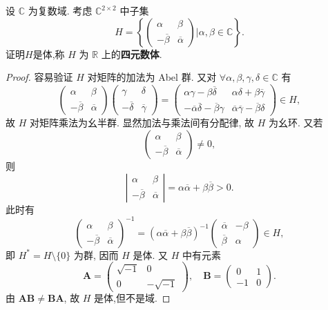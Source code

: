 \documentclass[../../main.tex]{subfiles}%
\begin{document}
\begin{theorem}\label{theorem:抽象代数--例题1.4.8}
设 \( \mathbb{C} \) 为复数域. 考虑 \( \mathbb{C}^{2 \times 2} \) 中子集
\[
H = \left\{ \begin{pmatrix} \alpha & \beta \\ -\overline{\beta} & \overline{\alpha} \end{pmatrix} \bigg| \alpha,\beta \in \mathbb{C} \right\}.
\]
证明$H$是体,称 \( H \) 为 \( \mathbb{R} \) 上的\textbf{四元数体}.
\end{theorem}
\begin{proof}
容易验证 \( H \) 对矩阵的加法为 Abel 群. 又对 \( \forall \alpha,\beta,\gamma,\delta \in \mathbb{C} \) 有
\[
\begin{pmatrix} \alpha & \beta \\ -\overline{\beta} & \overline{\alpha} \end{pmatrix} \begin{pmatrix} \gamma & \delta \\ -\overline{\delta} & \overline{\gamma} \end{pmatrix} = \begin{pmatrix} \alpha\gamma - \beta\overline{\delta} & \alpha\delta + \beta\overline{\gamma} \\ -\overline{\alpha}\overline{\delta} - \overline{\beta}\gamma & \overline{\alpha}\overline{\gamma} - \overline{\beta}\delta \end{pmatrix} \in H,
\]
故 \( H \) 对矩阵乘法为幺半群. 显然加法与乘法间有分配律, 故 \( H \) 为幺环. 又若
\[
\begin{pmatrix} \alpha & \beta \\ -\overline{\beta} & \overline{\alpha} \end{pmatrix} \neq 0,
\]
则
\[
\left| \begin{array}{cc} \alpha & \beta \\ -\overline{\beta} & \overline{\alpha} \end{array} \right| = \alpha\overline{\alpha} + \beta\overline{\beta} > 0.
\]
此时有
\[
\begin{pmatrix} \alpha & \beta \\ -\overline{\beta} & \overline{\alpha} \end{pmatrix}^{-1} = (\alpha\overline{\alpha} + \beta\overline{\beta})^{-1} \begin{pmatrix} \overline{\alpha} & -\beta \\ \overline{\beta} & \alpha \end{pmatrix} \in H,
\]
即 \( H^* = H \setminus \{0\} \) 为群, 因而 \( H \) 是体. 又 \( H \) 中有元素
\[
\boldsymbol{A} = \begin{pmatrix} \sqrt{-1} & 0 \\ 0 & -\sqrt{-1} \end{pmatrix}, \quad \boldsymbol{B} = \begin{pmatrix} 0 & 1 \\ -1 & 0 \end{pmatrix}.
\]
由 \( \boldsymbol{AB} \neq \boldsymbol{BA} \), 故 \( H \) 是体,但不是域.
\end{proof}
\end{document}
